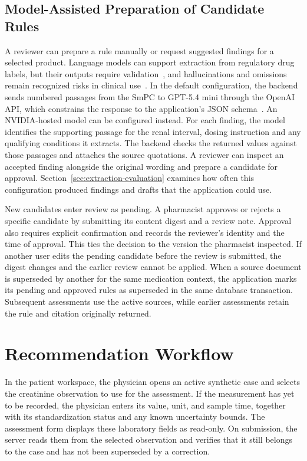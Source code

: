 \documentclass[12pt,a4paper,twoside]{book}
\begin{document}
\subsection{Model-Assisted Preparation of Candidate Rules}
\label{ssec:model-assisted-preparation}

A reviewer can prepare a rule manually or request suggested findings for a selected product.
Language models can support extraction from regulatory drug labels, but their outputs require validation~\cite{artWu2025AskFDALabel,artGisladottir2025DrugSafetyLLM}, and hallucinations and omissions remain recognized risks in clinical use~\cite{artJung2025LLMsMedicine,artAsgari2025LLMHallucinationSafety}.
In the default configuration, the backend sends numbered passages from the SmPC to GPT-5.4 mini through the OpenAI API, which constrains the response to the application's JSON schema~\cite{miscOpenAIStructuredOutputs}.
An NVIDIA-hosted model can be configured instead.
For each finding, the model identifies the supporting passage for the renal interval, dosing instruction and any qualifying conditions it extracts.
The backend checks the returned values against those passages and attaches the source quotations.
A reviewer can inspect an accepted finding alongside the original wording and prepare a candidate for approval.
Section~\ref{sec:extraction-evaluation} examines how often this configuration produced findings and drafts that the application could use.

New candidates enter review as pending. A pharmacist approves or rejects a specific candidate by submitting its content digest and a review note. Approval also requires explicit confirmation and records the reviewer's identity and the time of approval.
This ties the decision to the version the pharmacist inspected. If another user edits the pending candidate before the review is submitted, the digest changes and the earlier review cannot be applied.
When a source document is superseded by another for the same medication context, the application marks its pending and approved rules as superseded in the same database transaction. Subsequent assessments use the active sources, while earlier assessments retain the rule and citation originally returned.

\section{Recommendation Workflow}
\label{sec:recommendation-workflow}

In the patient workspace, the physician opens an active synthetic case and selects the creatinine observation to use for the assessment.
If the measurement has yet to be recorded, the physician enters its value, unit, and sample time, together with its standardization status and any known uncertainty bounds.
The assessment form displays these laboratory fields as read-only.
On submission, the server reads them from the selected observation and verifies that it still belongs to the case and has not been superseded by a correction.
\end{document}
